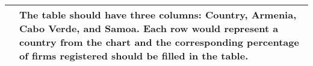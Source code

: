 \begin{tabular}{ll}
\toprule
 & The table should have three columns: Country, Armenia, Cabo Verde, and Samoa. Each row would represent a country from the chart and the corresponding percentage of firms registered should be filled in the table. \\
\midrule
\bottomrule
\end{tabular}
